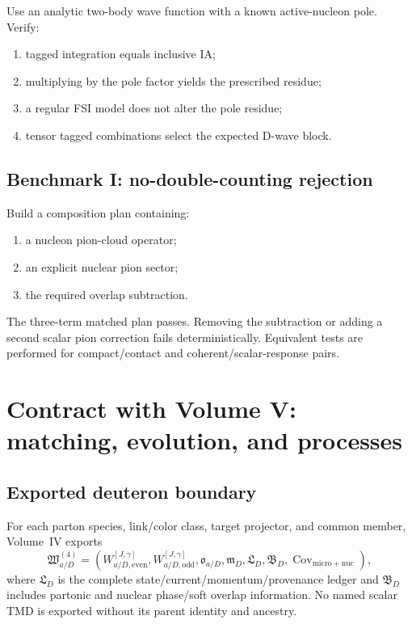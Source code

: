 \documentclass[11pt]{article}
\newcommand{\nuc}{\mathrm{nuc}}
\newcommand{\micro}{\mathrm{micro}}
\newcommand{\even}{\mathrm{even}}
\newcommand{\odd}{\mathrm{odd}}
\begin{document}
Use an analytic two-body wave function with a known active-nucleon pole.
Verify:
\begin{enumerate}
\item tagged integration equals inclusive IA;
\item multiplying by the pole factor yields the prescribed residue;
\item a regular FSI model does not alter the pole residue;
\item tensor tagged combinations select the expected D-wave block.
\end{enumerate}

\subsection{Benchmark I: no-double-counting rejection}

Build a composition plan containing:
\begin{enumerate}
\item a nucleon pion-cloud operator;
\item an explicit nuclear pion sector;
\item the required overlap subtraction.
\end{enumerate}
The three-term matched plan passes.  Removing the subtraction or adding a
second scalar pion correction fails deterministically.  Equivalent tests are
performed for compact/contact and coherent/scalar-response pairs.

\section{Contract with Volume V: matching, evolution, and processes}
\label{sec:volume-v-contract}

\subsection{Exported deuteron boundary}

For each parton species, link/color class, target projector, and common member,
Volume~IV exports
\begin{equation}
 \mathfrak W_{a/D}^{(4)}=
 \left(
 W_{a/D,\even}^{[J,\gamma]},
 W_{a/D,\odd}^{[J,\gamma]},
 \mathfrak o_{a/D},
 \mathfrak m_D,
 \mathfrak L_D,
 \mathfrak B_D,
 \operatorname{Cov}_{\micro+\nuc}
 \right),
\label{eq:volume4-export}
\end{equation}
where \(\mathfrak L_D\) is the complete state/current/momentum/provenance
ledger and \(\mathfrak B_D\) includes partonic and nuclear phase/soft overlap
information.  No named scalar TMD is exported without its parent identity and
ancestry.
\end{document}
